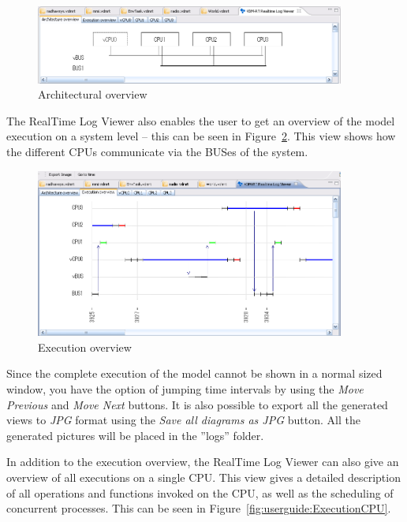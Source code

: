 \begin{figure}[htp]
\begin{center}
  \includegraphics[width=4in]{figures/ArchitectureOverview}
  \caption{Architectural overview}
  \label{fig:userguide:ArchitecturalOverview}
\end{center}
\end{figure}

The RealTime Log Viewer also enables the user to get an overview of
the model execution on a system level -- this can be seen in
Figure~\ref{fig:userguide:ExecutionOverview}. This view shows how the
different CPUs communicate via the BUSes of the system.

\begin{figure}[htp]
\begin{center}
  \includegraphics[width=4in]{figures/ExecutionOverview}
  \caption{Execution overview}
  \label{fig:userguide:ExecutionOverview}
\end{center}
\end{figure}

Since the complete execution of the model cannot be shown in a normal
sized window, you have the option of jumping time intervals by using the \emph{Move Previous} and \emph{Move Next} buttons. It is also possible to export all
the generated views to \emph{JPG} format using the \emph{Save all diagrams as JPG}
button. All the generated pictures will be placed in the ''logs''
folder.

In addition to the execution overview, the RealTime Log Viewer can
also give an overview of all executions on a single CPU. This view
gives a detailed description of all operations and functions invoked
on the CPU, as well as the scheduling of concurrent processes. This can
be seen in Figure~\ref{fig:userguide:ExecutionCPU}.

